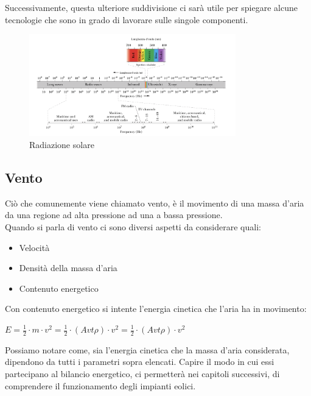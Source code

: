 Successivamente, questa ulteriore suddivisione ci sarà utile per spiegare alcune tecnologie che sono in grado di lavorare sulle singole componenti.
\begin{figure}[H]
    \centering
    \includegraphics[width=0.8\textwidth]{res/cap 2/luce_dettagli.png}
    \caption{Radiazione solare}
\end{figure}

\newpage
\subsection{Vento}

Ciò che comunemente viene chiamato vento, è il movimento di una massa d'aria da una regione ad alta pressione ad una a bassa pressione.\\
Quando si parla di vento ci sono diversi aspetti da considerare quali:
\begin{itemize}
    \item Velocità
    \item Densità della massa d'aria
    \item Contenuto energetico
\end{itemize}
\noindent 
Con contenuto energetico si intente l'energia cinetica che l'aria ha in movimento:
\begin{center}
    \large{\(E=\frac{1}{2}\cdot m\cdot v^2 = \frac{1}{2} \cdot(Avt\rho)\cdot v^2 = \frac{1}{2} \cdot(Avt\rho)\cdot v^2 \)}
\end{center}
\noindent
Possiamo notare come, sia l'energia cinetica che la massa d'aria considerata, dipendono da tutti i parametri sopra elencati. Capire il modo in cui essi partecipano al bilancio energetico, ci permetterà nei capitoli successivi, di comprendere il funzionamento degli impianti eolici.

